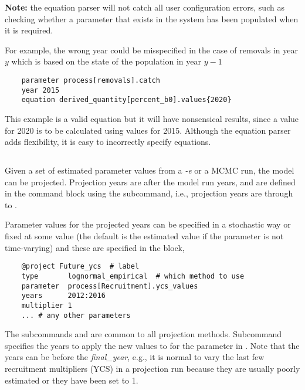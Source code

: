 \textbf{Note:} the equation parser will not catch all user configuration errors, such as checking whether a parameter that exists in the system has been populated when it is required.

For example, the wrong year could be misspecified in the case of removals in year $y$ which is based on the state of the population in year $y-1$

{\small{\begin{verbatim}
	parameter process[removals].catch
	year 2015
	equation derived_quantity[percent_b0].values{2020}
\end{verbatim}}}

This example is a valid equation but it will have nonsensical results, since a value for 2020 is to be calculated using values for 2015. Although the equation parser adds flexibility, it is easy to incorrectly specify equations.

\subsection{}\label{sec:Project}

Given a set of estimated parameter values from a \textit{-e} or a MCMC run,
the model can be projected. Projection years are after the model run years, and are defined in the  command block using the  subcommand, i.e., projection years are  through to .

Parameter values for the projected years can be specified in a stochastic way or fixed at some value (the default is the estimated value if the parameter is not time-varying) and these are specified in the  block,

{\small{\begin{verbatim}
	@project Future_ycs  # label
	type       lognormal_empirical  # which method to use
	parameter  process[Recruitment].ycs_values
	years      2012:2016
	multiplier 1
	... # any other parameters
\end{verbatim}}}

The subcommands  and  are common to all projection methods. Subcommand  specifies the years to apply the new values to for the parameter in . Note that the years can be before the \textit{final\_year}, e.g., it is normal to vary the last few recruitment multipliers (YCS) in a projection run because they are usually poorly estimated or they have been set to 1.  

